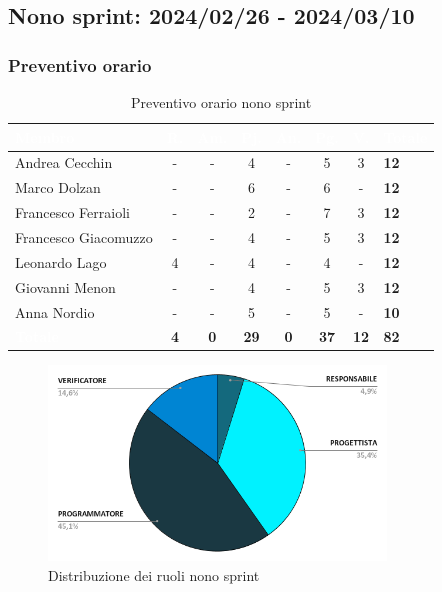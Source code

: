 \subsection{Nono sprint: 2024/02/26 - 2024/03/10}
\subsubsection{Preventivo orario}

{
\setlength{\tabcolsep}{10pt}
\renewcommand{\arraystretch}{1.5}
\begin{table}[h!]
    \centering
    \begin{tabularx}{\textwidth}{| l | c | c | c | c | c | c | X |}
        \hline
        \rowcolor{headerrow} \textbf{\textcolor{white}{Membro}} & \textbf{\textcolor{white}{R.}} & \textbf{\textcolor{white}{Am.}} & \textbf{\textcolor{white}{Pj.}} & \textbf{\textcolor{white}{An.}} & \textbf{\textcolor{white}{Pg.}} & \textbf{\textcolor{white}{V.}} & \textbf{\textcolor{white}{Totale}} \\
        \hline
        Andrea Cecchin & - & - & 4 & - & 5 & 3 & \textbf{12} \\
        \hline
        Marco Dolzan & - & - & 6 & - & 6 & - & \textbf{12} \\
        \hline
        Francesco Ferraioli & - & - & 2 & - & 7 & 3 & \textbf{12} \\
        \hline  
        Francesco Giacomuzzo & - & - & 4 & - & 5 & 3 & \textbf{12} \\
        \hline
        Leonardo Lago & 4 & - & 4 & - & 4 & - & \textbf{12} \\
        \hline
        Giovanni Menon & - & - & 4 & - & 5 & 3 & \textbf{12} \\
        \hline
        Anna Nordio & - & - & 5 & - & 5 & - & \textbf{10} \\
        \hline
    \cellcolor{headerrow} \textbf{\textcolor{white}{Totale}} & \textbf{4} & \textbf{0} & \textbf{29} & \textbf{0} & \textbf{37} & \textbf{12} & \textbf{82} \\
        \hline
    \end{tabularx} 
    \caption{Preventivo orario nono sprint}
    \label{tab:preventivoorariononosprint}
\end{table}
}

\begin{figure}[h!]
    \centering
    \includegraphics[width=0.8\textwidth]{prev9ruoli.png}
    \caption{Distribuzione dei ruoli nono sprint}
    \label{fig:preventivoorariononosprint}
\end{figure}


